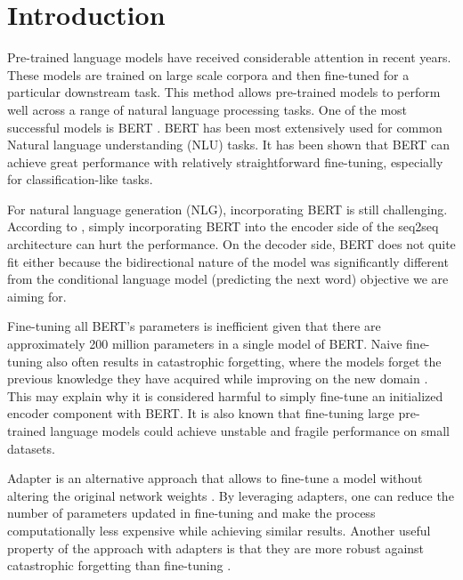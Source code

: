 \chapter*{Introduction}
Pre-trained language models  have received considerable attention in recent years. These models are trained on large scale corpora and then fine-tuned for a particular downstream task. This method allows pre-trained models to perform well across a range of natural language processing tasks. One of the most successful models is BERT . BERT has been most extensively used for common Natural language understanding (NLU) tasks. It has been shown that BERT can achieve great performance with relatively straightforward fine-tuning, especially for classification-like tasks.

For natural language generation (NLG), incorporating BERT is still challenging. According to , simply incorporating BERT into the encoder side of the seq2seq architecture can hurt the performance. On the decoder side, BERT does not quite fit either because the bidirectional nature of the model was significantly different from the conditional language model (predicting the next word) objective we are aiming for.

Fine-tuning all BERT's parameters is inefficient given that there are approximately 200 million parameters in a single model of BERT. Naive fine-tuning also often results in catastrophic forgetting, where the models forget the previous knowledge they have acquired while improving on the new domain . This may explain why it is considered harmful to simply fine-tune an initialized encoder component with BERT. It is also known that fine-tuning large pre-trained language models could achieve unstable and fragile performance on small datasets.

Adapter is an alternative approach that allows to fine-tune a model without altering the original network weights . By leveraging adapters, one can reduce the number of parameters updated in fine-tuning and make the process computationally less expensive while achieving similar results. Another useful property of the approach with adapters is that they are more robust against catastrophic forgetting than fine-tuning .

